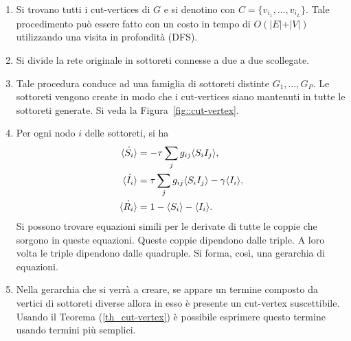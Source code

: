 \begin{enumerate}
	\item Si trovano tutti i cut-vertices di $G$ e si denotino con $C=\{ v_{i_1}, \dots, v_{i_L}\}$. Tale procedimento pu\`o essere fatto con  un costo in tempo di $O(\vert E \vert + \vert V \vert)$ utilizzando una visita in profondit\`a (DFS). 
	\item Si divide la rete originale in sottoreti connesse a due a due scollegate.
	\item Tale procedura conduce ad una famiglia di sottoreti distinte $G_1, \dots, G_P$. Le sottoreti vengono create in modo che i cut-vertices siano mantenuti in tutte le sottoreti generate. Si veda la Figura~\ref{fig::cut-vertex}.
	\item Per ogni nodo $i$ delle sottoreti, si ha 
	\begin{equation*}
	\begin{aligned}
\dot{\langle S_i \rangle} &= -\tau \sum_j g_{ij} \langle S_iI_j \rangle,\\
\dot{\langle I_i \rangle} &= \tau \sum_j g_{ij} \langle S_iI_j \rangle-\gamma\langle I_i \rangle,\\
\dot{\langle R_i \rangle} &= 1 -\langle S_i \rangle -\langle I_i \rangle.
		\end{aligned}
	\end{equation*}
	Si possono trovare  equazioni simili per le derivate di tutte le coppie che sorgono in queste equazioni. Queste coppie dipendono dalle triple. A loro volta le triple dipendono dalle quadruple. Si forma, cos\`i, una gerarchia di equazioni.
	\item Nella gerarchia che si verr\`a a creare, se appare un termine composto da  vertici di sottoreti diverse allora in esso \`e presente un cut-vertex suscettibile. Usando il Teorema (\ref{th_cut-vertex}) \`e possibile esprimere questo termine usando termini pi\`u semplici.
\end{enumerate}
\newpage
